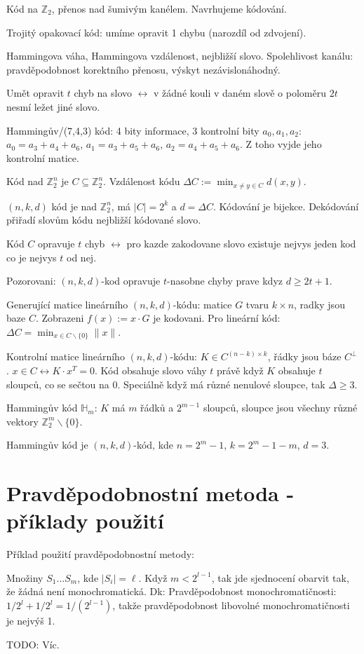 \documentclass[a4paper,10pt,titlepage]{article} \usepackage[utf8]{inputenc}
\def\Z{\mathbb{Z}}
\begin{document}
Kód na $\Z_2$, přenos nad šumivým kanélem. Navrhujeme kódování.

Trojitý opakovací kód: umíme opravit 1 chybu (narozdíl od zdvojení).

Hammingova váha, Hammingova vzdálenost, nejbližší slovo. Spolehlivost kanálu:
pravděpodobnost korektního přenosu, výskyt nezávislonáhodný.

Umět opravit $t$ chyb na slovo $\leftrightarrow$ v žádné kouli v daném slově o
poloměru $2t$ nesmí ležet jiné slovo.

Hammingův/(7,4,3) kód: 4 bity informace, 3 kontrolní bity $a_0, a_1, a_2$:
$a_0=a_3+a_4+a_6$, $a_1=a_3+a_5+a_6$, $a_2=a_4+a_5+a_6$. Z toho vyjde jeho
kontrolní matice.

Kód nad $\Z_2^n$ je $C\subseteq\Z_2^n$. Vzdálenost kódu $\Delta C:=\min_{x\neq
y\in C} d(x,y)$.

$(n,k,d)$ kód je nad $\Z_2^n$, má $|C|=2^k$ a $d=\Delta C$.
Kódování je bijekce. Dekódování přiřadí slovům kódu nejbližší kódované slovo.

Kód $C$ opravuje $t$ chyb $\leftrightarrow$ pro kazde zakodovane slovo
existuje nejvys jeden kod co je nejvys $t$ od nej.

Pozorovani: $(n,k,d)$-kod opravuje $t$-nasobne chyby prave kdyz $d\geq 2t+1$.

Generující matice lineárního $(n,k,d)$-kódu: matice $G$ tvaru $k\times n$,
radky jsou baze $C$. Zobrazeni $f(x):=x\cdot G$ je kodovani.
Pro lineární kód: $\Delta C=\min_{x\in C\smallsetminus\{0\}}\|x\|$.

Kontrolní matice lineárního $(n,k,d)$-kódu: $K\in C^{(n-k)\times k}$, řádky
jsou báze $C^\perp$. $x\in C\leftrightarrow K\cdot x^T=0$. Kód obsahuje slovo
váhy $t$ právě když $K$ obsahuje $t$ sloupců, co se sečtou na 0.
Speciálně když má různé nenulové sloupce, tak $\Delta\geq 3$.

Hammingův kód $\mathbb{H}_m$: $K$ má $m$ řádků a $2^{m-1}$ sloupců,
sloupce jsou všechny různé vektory $\Z_2^m\smallsetminus\{0\}$.

Hammingův kód je $(n,k,d)$-kód, kde $n=2^m-1$, $k=2^m-1-m$, $d=3$.

\section{Pravděpodobnostní metoda - příklady použití}
\vykradeno

Příklad použití pravděpodobnostní metody:

Množiny $S_1\ldots S_m$, kde $|S_i|=\ell$. Když $m<2^{l-1}$, tak jde sjednocení
obarvit tak, že žádná není monochromatická.
Dk: Pravděpodobnost monochromatičnosti: $1/2^l + 1/2^l = 1/(2^{l-1})$,
takže pravděpodobnost libovolné monochromatičnosti je nejvýš 1.

TODO: Víc.
\end{document}
